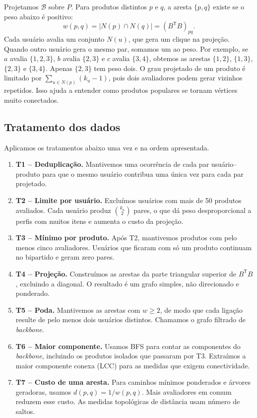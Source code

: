 \documentclass[sigconf,nonacm]{webmedia}
\begin{document}
Projetamos \(\mathcal B\) sobre \(P\). Para produtos distintos
\(p\) e \(q\), a aresta \(\{p,q\}\) existe se o peso abaixo é
positivo:
\[
  w(p,q)=|N(p)\cap N(q)|=(B^{\mathsf T}B)_{pq}.
\]
Cada usuário avalia um conjunto \(N(u)\), que gera um clique na
projeção. Quando outro usuário gera o mesmo par, somamos um ao peso.
Por exemplo, se \(a\) avalia \(\{1,2,3\}\), \(b\) avalia
\(\{2,3\}\) e \(c\) avalia \(\{3,4\}\), obtemos as arestas
\(\{1,2\}\), \(\{1,3\}\), \(\{2,3\}\) e \(\{3,4\}\).
Apenas \(\{2,3\}\) tem peso dois. O grau projetado de um produto
é limitado por \(\sum_{u\in N(p)}(k_u-1)\), pois dois avaliadores
podem gerar vizinhos repetidos. Isso ajuda a entender como produtos
populares se tornam vértices muito conectados.

\subsection{Tratamento dos dados}

Aplicamos os tratamentos abaixo uma vez e na ordem apresentada.

\begin{enumerate}
  \item \textbf{T1 -- Deduplicação.} Mantivemos uma ocorrência de
  cada par usuário--produto para que o mesmo usuário contribua uma
  única vez para cada par projetado.
  \item \textbf{T2 -- Limite por usuário.} Excluímos usuários com
  mais de 50 produtos avaliados. Cada usuário produz
  \(\binom{k_u}{2}\) pares, o que dá peso desproporcional a
  perfis com muitos itens e aumenta o custo da projeção.
  \item \textbf{T3 -- Mínimo por produto.} Após T2, mantivemos produtos
  com pelo menos cinco avaliadores. Usuários que ficaram com só
  um produto continuam no bipartido e geram zero pares.
  \item \textbf{T4 -- Projeção.} Construímos as arestas da parte
  triangular superior de \(B^{\mathsf T}B\), excluindo a diagonal.
  O resultado é um grafo simples, não direcionado e ponderado.
  \item \textbf{T5 -- Poda.} Mantivemos as arestas com \(w\geq2\),
  de modo que cada ligação resulte de pelo menos dois usuários
  distintos. Chamamos o grafo filtrado de \emph{backbone}.
  \item \textbf{T6 -- Maior componente.} Usamos BFS para contar as
  componentes do \emph{backbone}, incluindo os produtos isolados
  que passaram por T3. Extraímos a maior componente conexa (LCC)
  para as medidas que exigem conectividade.
  \item \textbf{T7 -- Custo de uma aresta.} Para caminhos mínimos
  ponderados e árvores geradoras, usamos \(d(p,q)=1/w(p,q)\).
  Mais avaliadores em comum reduzem esse custo.
  As medidas topológicas de distância usam número de saltos.
\end{enumerate}
\end{document}
